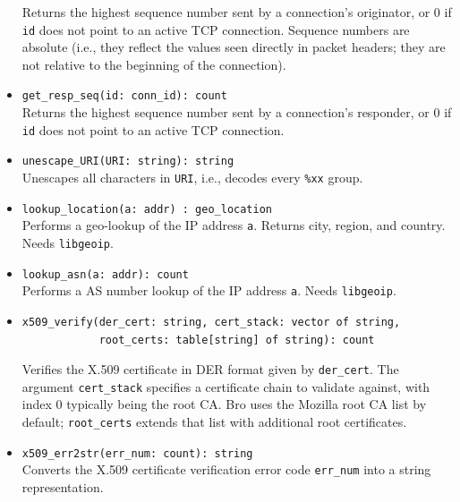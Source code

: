\documentclass[10pt,landscape]{article}
\begin{document}
\begin{multicols*}{2}
\begin{itemize}
    Returns the highest sequence number sent by a connection's originator, or 0
    if \verb|id| does not point to an active TCP connection. Sequence numbers
    are absolute (i.e., they reflect the values seen directly in packet
    headers; they are not relative to the beginning of the connection).
  \item \verb|get_resp_seq(id: conn_id): count|\\
    Returns the highest sequence number sent by a connection's responder, or 0
    if \verb|id| does not point to an active TCP connection.
  \item \verb|unescape_URI(URI: string): string|\\
    Unescapes all characters in \texttt{URI}, i.e., decodes every \verb|%xx|
    group.
  \item \verb|lookup_location(a: addr) : geo_location|\\
    Performs a geo-lookup of the IP address \verb|a|. Returns city, region, and
    country. Needs \texttt{libgeoip}.
  \item \verb|lookup_asn(a: addr): count|\\
    Performs a AS number lookup of the IP address \verb|a|. 
    Needs \texttt{libgeoip}.
  \item
\begin{verbatim}
x509_verify(der_cert: string, cert_stack: vector of string,
            root_certs: table[string] of string): count
\end{verbatim}
    Verifies the X.509 certificate in DER format given by \verb|der_cert|. The
    argument \verb|cert_stack| specifies a certificate chain to validate
    against, with index 0 typically being the root CA. Bro uses the Mozilla 
    root CA list by default; \verb|root_certs| extends that list with
    additional root certificates.
  \item \verb|x509_err2str(err_num: count): string|\\
    Converts the X.509 certificate verification error code \verb|err_num| into
    a string representation.
\end{itemize}


\end{multicols*}
\end{document}
